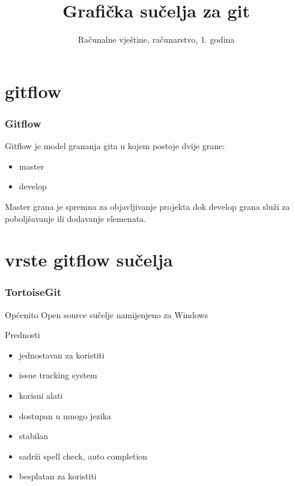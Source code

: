 \documentclass[hyperref={bookmarks=false},aspectratio=169]{beamer}
\title[Grafička sučelja za git]
{\bfseries{Grafička sučelja za git}}
\author[Sandro Šafar \and Stella Dumenić\and Robin Šćulac]
{}
\institute[Riteh]
\date[25.1.2019.]
{Računalne vještine, računarstvo, 1. godina}
\begin{document}
\frame{\titlepage}  %



\section{gitflow}

\begin{frame}

\frametitle{Gitflow}
Gitflow je model grananja gita u kojem postoje dvije grane:

\begin{itemize}
    \item master 
    \item develop

\end{itemize}

Master grana je spremna za objavljivanje projekta dok develop grana služi za poboljšavanje ili dodavanje elemenata.

\end{frame}



\section{vrste gitflow sučelja}


\begin{frame}
\frametitle{TortoiseGit}

\begin{block}{\tiny{Općenito}}
Open source sučelje namijenjeno za Windows
\end{block}
\begin{block}{Prednosti}

    \begin{itemize}
    \item jednostavan za koristiti 
    \item issue tracking system
    \item korisni alati
    \item dostupan u mnogo jezika
    \item stabilan
    \item sadrži spell check, auto completion
    \item besplatan za koristiti
    \end{itemize}
\end{block}
\end{frame}
\end{document}
